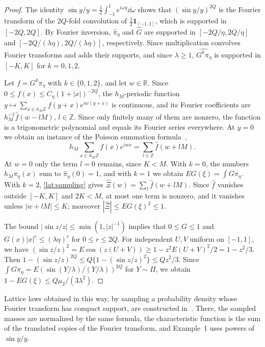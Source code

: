 \begin{proof}
The identity $\sin y/y=\frac12\int_{-1}^1e^{i\omega y}\dd\omega$ shows
that $(\sin y/y)^{2Q}$ is the Fourier transform of the $2Q$-fold
convolution of $\frac12\mathbf 1_{[-1,1]}$, which is supported in
$[-2Q,2Q]$. By Fourier inversion, $\widehat\pi_\eta$ and $\widehat G$
are supported in $[-2Q/\eta,2Q/\eta]$ and
$[-2Q/(\lambda\eta),2Q/(\lambda\eta)]$, respectively. Since
multiplication convolves Fourier transforms and adds their supports, and
since $\lambda\ge1$, $\widehat{G^k\pi_\eta}$ is supported in $[-K,K]$ for
$k=0,1,2$.

Let $f=G^k\pi_\eta$ with $k\in\{0,1,2\}$, and let $w\in\mathbb R$.
Since $0\le f(x)\le C_\eta(1+|x|)^{-2Q}$, the $h_M$-periodic function
$y\mapsto\sum_{x\in h_M\mathbb Z}f(y+x)e^{iw(y+x)}$ is continuous, and
its Fourier coefficients are $h_M^{-1}\widehat f(w-lM)$,
$l\in\mathbb Z$. Since only finitely many of them are nonzero, the
function is a trigonometric polynomial and equals its Fourier series
everywhere. At $y=0$ we obtain an instance of the Poisson summation
formula~\cite[Chapter~5, Section~3]{steinshakarchi},
\begin{equation}\label{lat:sampling}
 h_M\sum_{x\in h_M\mathbb Z}f(x)e^{iwx}
       =\sum_{l\in\mathbb Z}\widehat f(w+lM).
\end{equation}
At $w=0$ only the term $l=0$ remains, since $K<M$. With $k=0$, the
numbers $h_M\pi_\eta(x)$ sum to $\widehat\pi_\eta(0)=1$, and with $k=1$
we obtain $EG(\xi)=\int G\pi_\eta$. With $k=2$, \eqref{lat:sampling}
gives $\widehat\Xi(w)=\sum_l\widehat f(w+lM)$. Since $\widehat f$
vanishes outside $[-K,K]$ and $2K<M$, at most one term is nonzero, and
it vanishes unless $|w+lM|\le K$; moreover
$|\widehat\Xi|\le EG(\xi)^2\le1$.

The bound $|\sin z/z|\le\min(1,|z|^{-1})$ implies that $0\le G\le1$ and
$G(x)|x|^r\le(\lambda\eta)^r$ for $0\le r\le2Q$. For independent $U,V$
uniform on $[-1,1]$, we have
$(\sin z/z)^2=E\cos(z(U+V))\ge1-z^2E(U+V)^2/2=1-z^2/3$. Then
$1-(\sin z/z)^{2Q}\le Q\{1-(\sin z/z)^2\}\le Qz^2/3$. Since
$\int G\pi_\eta=E(\sin(Y/\lambda)/(Y/\lambda))^{2Q}$ for $Y\sim\Pi$, we
obtain $1-EG(\xi)\le Q\mu_2/(3\lambda^2)$.
\end{proof}

Lattice laws obtained in this way, by sampling a probability density
whose Fourier transform has compact support, are constructed
in~\cite[Section~V, Proposition~5 and Corollary~6]{vatedka2015}. There,
the sampled masses are normalized by the same formula, the
characteristic function is the sum of the translated copies of the
Fourier transform, and Example~1 uses powers of $\sin y/y$.

